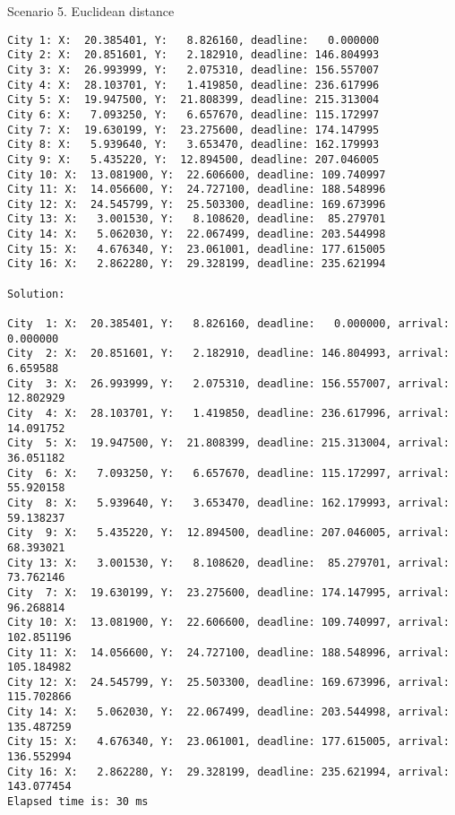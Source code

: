 \documentclass[a4paper, 12pt]{article}
\begin{document}
Scenario 5. Euclidean distance

\begin{lstlisting}
City 1: X:  20.385401, Y:   8.826160, deadline:   0.000000
City 2: X:  20.851601, Y:   2.182910, deadline: 146.804993
City 3: X:  26.993999, Y:   2.075310, deadline: 156.557007
City 4: X:  28.103701, Y:   1.419850, deadline: 236.617996
City 5: X:  19.947500, Y:  21.808399, deadline: 215.313004
City 6: X:   7.093250, Y:   6.657670, deadline: 115.172997
City 7: X:  19.630199, Y:  23.275600, deadline: 174.147995
City 8: X:   5.939640, Y:   3.653470, deadline: 162.179993
City 9: X:   5.435220, Y:  12.894500, deadline: 207.046005
City 10: X:  13.081900, Y:  22.606600, deadline: 109.740997
City 11: X:  14.056600, Y:  24.727100, deadline: 188.548996
City 12: X:  24.545799, Y:  25.503300, deadline: 169.673996
City 13: X:   3.001530, Y:   8.108620, deadline:  85.279701
City 14: X:   5.062030, Y:  22.067499, deadline: 203.544998
City 15: X:   4.676340, Y:  23.061001, deadline: 177.615005
City 16: X:   2.862280, Y:  29.328199, deadline: 235.621994

Solution: 

City  1: X:  20.385401, Y:   8.826160, deadline:   0.000000, arrival:   0.000000
City  2: X:  20.851601, Y:   2.182910, deadline: 146.804993, arrival:   6.659588
City  3: X:  26.993999, Y:   2.075310, deadline: 156.557007, arrival:  12.802929
City  4: X:  28.103701, Y:   1.419850, deadline: 236.617996, arrival:  14.091752
City  5: X:  19.947500, Y:  21.808399, deadline: 215.313004, arrival:  36.051182
City  6: X:   7.093250, Y:   6.657670, deadline: 115.172997, arrival:  55.920158
City  8: X:   5.939640, Y:   3.653470, deadline: 162.179993, arrival:  59.138237
City  9: X:   5.435220, Y:  12.894500, deadline: 207.046005, arrival:  68.393021
City 13: X:   3.001530, Y:   8.108620, deadline:  85.279701, arrival:  73.762146
City  7: X:  19.630199, Y:  23.275600, deadline: 174.147995, arrival:  96.268814
City 10: X:  13.081900, Y:  22.606600, deadline: 109.740997, arrival: 102.851196
City 11: X:  14.056600, Y:  24.727100, deadline: 188.548996, arrival: 105.184982
City 12: X:  24.545799, Y:  25.503300, deadline: 169.673996, arrival: 115.702866
City 14: X:   5.062030, Y:  22.067499, deadline: 203.544998, arrival: 135.487259
City 15: X:   4.676340, Y:  23.061001, deadline: 177.615005, arrival: 136.552994
City 16: X:   2.862280, Y:  29.328199, deadline: 235.621994, arrival: 143.077454
Elapsed time is: 30 ms

\end{lstlisting}
\end{document}
